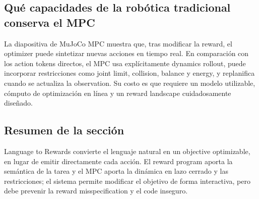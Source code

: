 \subsection{Qué capacidades de la robótica tradicional conserva el MPC}

La diapositiva de MuJoCo MPC muestra que, tras modificar la reward, el optimizer puede sintetizar nuevas acciones en tiempo real. En comparación con los action tokens directos, el MPC usa explícitamente dynamics rollout, puede incorporar restricciones como joint limit, collision, balance y energy, y replanifica cuando se actualiza la observation. Su costo es que requiere un modelo utilizable, cómputo de optimización en línea y un reward landscape cuidadosamente diseñado.




\subsection{Resumen de la sección}

Language to Rewards convierte el lenguaje natural en un objective optimizable, en lugar de emitir directamente cada acción. El reward program aporta la semántica de la tarea y el MPC aporta la dinámica en lazo cerrado y las restricciones; el sistema permite modificar el objetivo de forma interactiva, pero debe prevenir la reward misspecification y el code inseguro.
